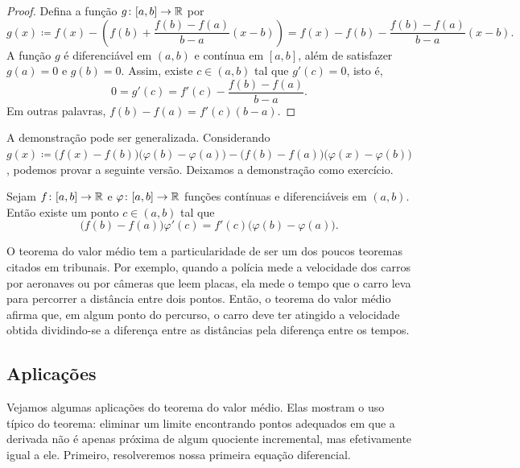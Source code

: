 \begin{proof}
Defina a
função $g \colon [a,b] \to {\mathbb{R}}$ por
\begin{equation*}
g(x) \coloneqq
f(x)-
\left( f(b)+\frac{f(b)-f(a)}{b-a}(x-b) \right)
=
f(x)-
f(b)-\frac{f(b)-f(a)}{b-a}(x-b) .
\end{equation*}
A função $g$ é diferenciável em $(a,b)$
e contínua em $[a,b]$, além de satisfazer $g(a) = 0$ e $g(b) = 0$. Assim, existe
$c \in (a,b)$ tal que $g'(c) = 0$, isto é,
\begin{equation*}
0 = g'(c) = f'(c)-\frac{f(b)-f(a)}{b-a} .
\end{equation*}
Em outras palavras,
$f(b)-f(a) = f'(c)(b-a)$.
\end{proof}

A demonstração pode ser generalizada. Considerando
$g(x) \coloneqq
\bigl(f(x)-f(b)\bigr)
\bigl(\varphi(b)-\varphi(a)\bigr)
-
\bigl(f(b)-f(a)\bigr)
\bigl(\varphi(x)-\varphi(b)\bigr)$,
podemos provar a seguinte versão. Deixamos a demonstração como exercício.

\begin{thm} \label{thm:cauchymvt}
Sejam $f \colon [a,b] \to {\mathbb{R}}$ e $\varphi \colon [a,b] \to {\mathbb{R}}$ funções contínuas
e diferenciáveis em $(a,b)$. Então existe um ponto $c \in (a,b)$
tal que
\begin{equation*}
\bigl(f(b)-f(a)\bigr)\varphi'(c) = f'(c)\bigl(\varphi(b)-\varphi(a)\bigr) .
\end{equation*}
\end{thm}

O teorema do valor médio tem a particularidade de ser um dos poucos teoremas
citados
em tribunais. Por exemplo, quando a polícia mede a velocidade dos carros por
aeronaves ou por câmeras que leem placas, ela
mede o tempo que o carro leva para percorrer a distância entre dois pontos.
Então, o teorema do valor médio
afirma que, em algum ponto do percurso, o carro deve ter atingido a velocidade
obtida dividindo-se a diferença entre as distâncias pela diferença entre os tempos.



\subsection{Aplicações}

Vejamos algumas aplicações do teorema do valor médio.
Elas mostram o uso típico do teorema: eliminar um limite encontrando pontos
adequados em que a derivada não é apenas próxima de algum quociente incremental,
mas efetivamente igual a ele.
Primeiro, resolveremos nossa primeira equação diferencial.

